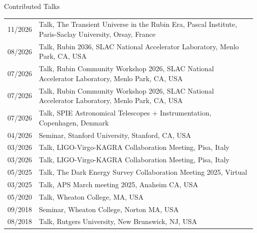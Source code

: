 \begin{rSection}{Contributed Talks}
\setlength{\extrarowheight}{3pt}
\begin{longtable}{p{0.1\linewidth}p{0.89\linewidth}}
11/2026 & Talk, The Transient Universe in the Rubin Era, Pascal Institute, Paris-Saclay University, Orsay, France\\ 
08/2026 & Talk, Rubin 2036, SLAC National Accelerator Laboratory, Menlo Park, CA, USA\\ %
07/2026 & Talk, Rubin Community Workshop 2026, SLAC National Accelerator Laboratory, Menlo Park, CA, USA\\ %
07/2026 & Talk, Rubin Community Workshop 2026, SLAC National Accelerator Laboratory, Menlo Park, CA, USA\\
07/2026 & Talk, SPIE Astronomical Telescopes + Instrumentation, Copenhagen, Denmark\\ %
04/2026 & Seminar, Stanford University, Stanford, CA, USA \\
03/2026 & Talk, LIGO-Virgo-KAGRA Collaboration Meeting, Pisa, Italy\\ %
03/2026 & Talk, LIGO-Virgo-KAGRA Collaboration Meeting, Pisa, Italy\\ %
05/2025 & Talk, The Dark Energy Survey Collaboration Meeting 2025, Virtual\\ %
03/2025 & Talk, APS March meeting 2025, Anaheim CA, USA\\ %
05/2020 & Talk, Wheaton College, MA, USA\\ %
09/2018 & Seminar, Wheaton College, Norton MA, USA\\ %
08/2018 & Talk, Rutgers University, New Brunswick, NJ, USA\\ %
\end{longtable}
\end{rSection}
